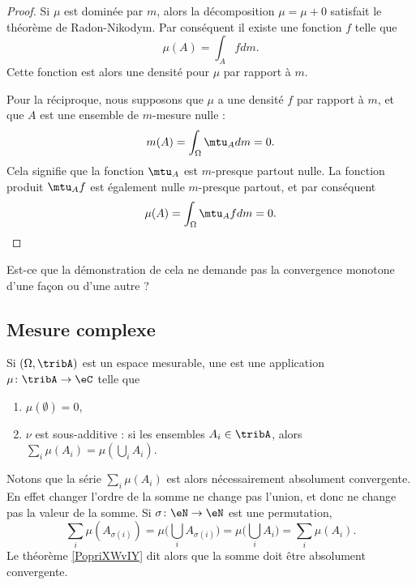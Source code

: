 \begin{proof}
    Si \( \mu\) est dominée par \( m\), alors la décomposition \( \mu=\mu+0\) satisfait le théorème de Radon-Nikodym. Par conséquent il existe une fonction \( f\) telle que
    \begin{equation}
        \mu(A)=\int_Afdm.
    \end{equation}
    Cette fonction est alors une densité pour \( \mu\) par rapport à \( m\).

    Pour la réciproque, nous supposons que \( \mu\) a une densité \( f\) par rapport à \( m\), et que \( A\) est une ensemble de \( m\)-mesure nulle :
    \begin{equation}
        m(A)=\int_{\Omega}\mtu_Adm=0.
    \end{equation}
    Cela signifie que la fonction \( \mtu_A\) est \( m\)-presque partout nulle. La fonction produit \( \mtu_Af\) est également nulle \( m\)-presque partout, et par conséquent
    \begin{equation}
        \mu(A)=\int_{\Omega}\mtu_Afdm=0.
    \end{equation}
\end{proof}

\begin{probleme}
    Est-ce que la démonstration de cela ne demande pas la convergence monotone d'une façon ou d'une autre ?
\end{probleme}

\subsection{Mesure complexe}

\begin{definition} \label{DefGKHLooYjocEt}
    Si \( (\Omega,\tribA)\) est un espace mesurable, une  est une application \( \mu\colon \tribA\to \eC\) telle que
    \begin{enumerate}
        \item
            $\mu(\emptyset)=0$,
        \item
            \( \nu\) est sous-additive : si les ensembles \( A_i\in\tribA\), alors \( \sum_i\mu(A_i)=\mu(\bigcup_iA_i)\).
    \end{enumerate}
\end{definition}
Notons que la série $\sum_i\mu(A_i)$ est alors nécessairement absolument convergente. En effet changer l'ordre de la somme ne change pas l'union, et donc ne change pas la valeur de la somme. Si \( \sigma\colon \eN\to \eN\) est une permutation, 
\begin{equation}
    \sum_i\mu(A_{\sigma(i)})=\mu\big( \bigcup_iA_{\sigma(i)} \big)=\mu\big( \bigcup_iA_i \big)=\sum_i\mu(A_i).
\end{equation}
Le théorème \ref{PopriXWvIY} dit alors que la somme doit être absolument convergente.



